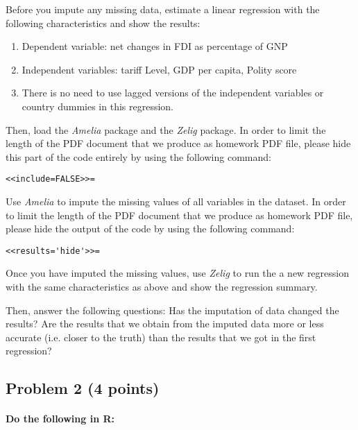 \documentclass[12pt]{article}
\begin{document}
\bigskip

Before you impute any missing data, estimate a linear regression with the following characteristics and show the results:

\begin{enumerate}
	\item Dependent variable: net changes in FDI as percentage of GNP
	\item Independent variables: tariff Level, GDP per capita, Polity score
	\item There is no need to use lagged versions of the independent variables or country dummies in this regression.
\end{enumerate}

\bigskip

Then, load the \textit{Amelia} package and the \textit{Zelig} package. In order to limit the length of the PDF document that we produce as homework PDF file, please hide this part of the code entirely by using the following command:
\begin{verbatim}
<<include=FALSE>>=
\end{verbatim}

Use \textit{Amelia} to impute the missing values of all variables in the dataset. In order to limit the length of the PDF document that we produce as homework PDF file, please hide the output of the code by using the following command:
\begin{verbatim}
<<results='hide'>>=
\end{verbatim}

Once you have imputed the missing values, use \textit{Zelig} to run the a new regression with the same characteristics as above and show the regression summary.

Then, answer the following questions: Has the imputation of data changed the results? Are the results that we obtain from the imputed data more or less accurate (i.e. closer to the truth) than the results that we got in the first regression?



\subsection*{Problem 2 (4 points)}

\paragraph{Do the following in R:}
\end{document}
